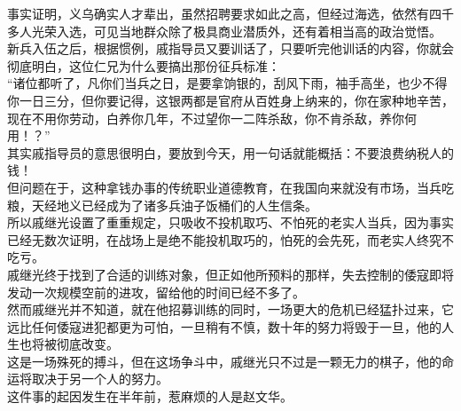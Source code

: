 \begin{multicols}{\theparacolNo}
事实证明，义乌确实人才辈出，虽然招聘要求如此之高，但经过海选，依然有四千多人光荣入选，可见当地群众除了极具商业潜质外，还有着相当高的政治觉悟。\\

新兵入伍之后，根据惯例，戚指导员又要训话了，只要听完他训话的内容，你就会彻底明白，这位仁兄为什么要搞出那份征兵标准：\\

“诸位都听了，凡你们当兵之日，是要拿饷银的，刮风下雨，袖手高坐，也少不得你一日三分，但你要记得，这银两都是官府从百姓身上纳来的，你在家种地辛苦，现在不用你劳动，白养你几年，不过望你一二阵杀敌，你不肯杀敌，养你何用！？”\\

其实戚指导员的意思很明白，要放到今天，用一句话就能概括：不要浪费纳税人的钱！\\

但问题在于，这种拿钱办事的传统职业道德教育，在我国向来就没有市场，当兵吃粮，天经地义已经成为了诸多兵油子饭桶们的人生信条。\\

所以戚继光设置了重重规定，只吸收不投机取巧、不怕死的老实人当兵，因为事实已经无数次证明，在战场上是绝不能投机取巧的，怕死的会先死，而老实人终究不吃亏。\\

戚继光终于找到了合适的训练对象，但正如他所预料的那样，失去控制的倭寇即将发动一次规模空前的进攻，留给他的时间已经不多了。\\

然而戚继光并不知道，就在他招募训练的同时，一场更大的危机已经猛扑过来，它远比任何倭寇进犯都更为可怕，一旦稍有不慎，数十年的努力将毁于一旦，他的人生也将被彻底改变。\\

这是一场殊死的搏斗，但在这场争斗中，戚继光只不过是一颗无力的棋子，他的命运将取决于另一个人的努力。\\

这件事的起因发生在半年前，惹麻烦的人是赵文华。\\
\ifnum{}
	\end{multicols}
\fi
\newpage
